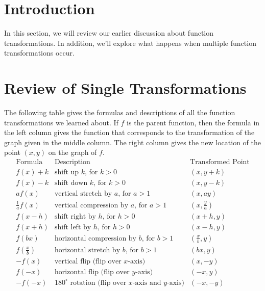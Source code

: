 \documentclass[handout, noauthor, nooutcomes]{ximera}
\begin{document}

\section{Introduction}
In this section, we will review our earlier discussion about function transformations. In addition, we'll explore what happens when multiple function transformations occur. 

\section{Review of Single Transformations}
The following table gives the formulas and descriptions of all the function transformations we learned about. If $f$ is the parent function, then the formula in the left column gives the function that corresponds to the transformation of the graph given in the middle column. The right column gives the new location of the point $(x, y)$ on the graph of $f$. 
$$
\begin{array}{c|c|c}
\text{Formula} & \text{Description} & \text{Transformed Point}\\
\hline
f(x) + k & \text{shift up }k\text{, for } k > 0 &(x, y + k) \\
f(x) - k & \text{shift down }k\text{, for } k > 0& (x, y - k)\\
af(x) & \text{vertical stretch by }a\text{, for }a > 1 & (x, ay)\\
\frac{1}{a}f(x) & \text{vertical compression by }a\text{, for }a > 1 & \left(x, \frac{y}{a}\right)\\
f(x - h) & \text{shift right by }h\text{, for }h > 0 & (x + h, y)\\
f(x + h) & \text{shift left by }h\text{, for }h > 0 & (x - h, y)\\
f(bx) & \text{horizontal compression by }b\text{, for }b > 1 & \left(\frac{x}{b}, y \right)\\
f\left(\frac{x}{b}\right) & \text{horizontal stretch by }b\text{, for }b > 1 & (bx, y)\\
-f(x) & \text{vertical flip (flip over }x\text{-axis)} & (x, -y)\\
f(-x) & \text{horizontal flip (flip over }y\text{-axis)} & (-x, y)\\
-f(-x) & \text{180}^\circ\text{ rotation (flip over }x\text{-axis and }y\text{-axis)} & (-x, -y)\\
\end{array}
$$
\end{document}
